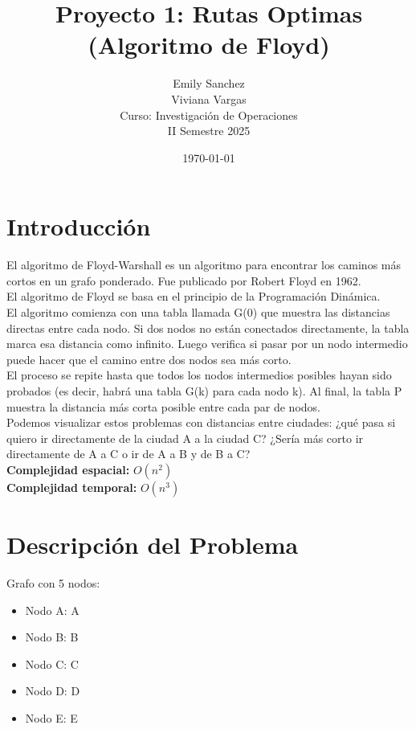 \documentclass[12pt]{article}
\title{Proyecto 1: Rutas Optimas (Algoritmo de Floyd)}
\author{Emily Sanchez \\ Viviana Vargas \\[1cm] Curso: Investigación de Operaciones \\ II Semestre 2025}
\date{\today}
\begin{document}
\maketitle
\thispagestyle{empty}
\newpage
\setcounter{page}{1}

\section{Introducción}
El algoritmo de Floyd-Warshall es un algoritmo para encontrar los caminos más cortos en un grafo ponderado. Fue publicado por Robert Floyd en 1962.\\
El algoritmo de Floyd se basa en el principio de la Programación Dinámica.\\
El algoritmo comienza con una tabla llamada G(0) que muestra las distancias directas entre cada nodo. Si dos nodos no están conectados directamente, la tabla marca esa distancia como infinito. Luego verifica si pasar por un nodo intermedio puede hacer que el camino entre dos nodos sea más corto.\\
El proceso se repite hasta que todos los nodos intermedios posibles hayan sido probados (es decir, habrá una tabla G(k) para cada nodo k). Al final, la tabla P muestra la distancia más corta posible entre cada par de nodos.\\
Podemos visualizar estos problemas con distancias entre ciudades: ¿qué pasa si quiero ir directamente de la ciudad A a la ciudad C? ¿Sería más corto ir directamente de A a C o ir de A a B y de B a C?\\
\textbf{Complejidad espacial:} $O(n^2)$\\
\textbf{Complejidad temporal:} $O(n^3)$\\
\clearpage
\section{Descripción del Problema}
Grafo con 5 nodos:

\begin{itemize}
\item Nodo A: A
\item Nodo B: B
\item Nodo C: C
\item Nodo D: D
\item Nodo E: E
\end{itemize}
\end{document}
